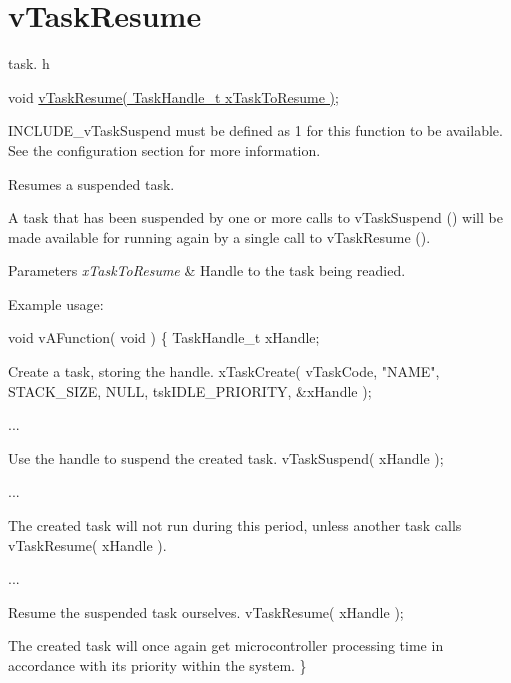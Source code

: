 \hypertarget{group__vTaskResume}{\section{v\-Task\-Resume}
\label{group__vTaskResume}
}
task. h 
\begin{DoxyPre}void \hyperlink{task_8h_a84a1584f29fb7736a1aa72ad5b3e9b44}{vTaskResume( TaskHandle\_t xTaskToResume )};\end{DoxyPre}


I\-N\-C\-L\-U\-D\-E\-\_\-v\-Task\-Suspend must be defined as 1 for this function to be available. See the configuration section for more information.

Resumes a suspended task.

A task that has been suspended by one or more calls to v\-Task\-Suspend () will be made available for running again by a single call to v\-Task\-Resume ().


\begin{DoxyParams}{Parameters}
{\em x\-Task\-To\-Resume} & Handle to the task being readied.\\
\hline
\end{DoxyParams}
Example usage\-: 
\begin{DoxyPre}
 void vAFunction( void )
 \{
 TaskHandle\_t xHandle;\end{DoxyPre}



\begin{DoxyPre}Create a task, storing the handle.
     xTaskCreate( vTaskCode, "NAME", STACK\_SIZE, NULL, tskIDLE\_PRIORITY, \&xHandle );\end{DoxyPre}



\begin{DoxyPre}...\end{DoxyPre}



\begin{DoxyPre}Use the handle to suspend the created task.
     vTaskSuspend( xHandle );\end{DoxyPre}



\begin{DoxyPre}...\end{DoxyPre}



\begin{DoxyPre}The created task will not run during this period, unless
another task calls vTaskResume( xHandle ).\end{DoxyPre}



\begin{DoxyPre}...\end{DoxyPre}



\begin{DoxyPre}Resume the suspended task ourselves.
     vTaskResume( xHandle );\end{DoxyPre}



\begin{DoxyPre}The created task will once again get microcontroller processing
time in accordance with its priority within the system.
 \}
   \end{DoxyPre}
 